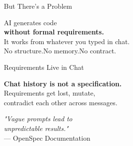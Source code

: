 \documentclass[aspectratio=169,18pt]{beamer}
\begin{document}
\begin{frame}{But There's a Problem}
  \vspace{1em}
  \begin{center}
    \Large AI generates code\\[0.5em]
    \textbf{without formal requirements.}\\[1.5em]
    \normalsize
    It works from whatever you typed in chat.\\[0.3em]
    No structure.\quad No memory.\quad No contract.
  \end{center}
\end{frame}

\begin{frame}{Requirements Live in Chat}
  \vspace{1em}
  \begin{center}
    \Large\textbf{Chat history is not a specification.}\\[1.5em]
    \normalsize
    Requirements get lost, mutate,\\
    contradict each other across messages.\\[1em]
  \end{center}
\end{frame}

\begin{frame}{}
  \vspace{3em}
  \begin{center}
    \Large\textit{"Vague prompts lead to\\[0.3em]
    unpredictable results."}\\[1.5em]
    \normalsize\color{opengray}— OpenSpec Documentation
  \end{center}
\end{frame}

\end{document}
